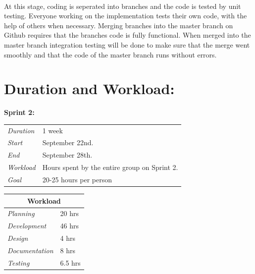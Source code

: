 \documentclass[11pt]{report}
\begin{document}
\paragraph{} At this stage, coding is seperated into branches and the code is tested by unit testing. Everyone working on the implementation tests their own code, with the help of others when necessary. Merging branches into the master branch on Github requires that the branches code is fully functional. When merged into the master branch integration testing will be done to make sure that the merge went smoothly and that the code of the master branch runs without errors. 

\section{Duration and Workload:}


\begin{minipage}{\linewidth}
\centering
\setlength{\tabcolsep}{22pt}
\textbf{Sprint 2:} 
\smallskip
{}
\begin{tabular}{ |l l| }
	\hline
	\it{Duration} & 1 week \\
	\it{Start} & September 22nd. \\
	\it{End} & September 28th. \\
	\it{Workload} & Hours spent by the entire group on Sprint 2. \\
	\it{Goal} & 20-25 hours per person \\
	\hline
\end{tabular}
\end{minipage}

\bigskip

\begin{minipage}{\linewidth}
\setlength{\tabcolsep}{25pt}
\centering
{}
\begin{tabular}{ |l|l| }
	\hline
	\multicolumn{2}{|c|}{\cellcolor{gray!25} Workload} \\
	\hline
	\it{Planning} & 20 hrs\\
	\it{Development} & 46 hrs \\
	\it{Design} & 4 hrs \\
	\it{Documentation} & 8 hrs \\
	\it{Testing} & 6.5 hrs \\
	\hline
\end{tabular}
\end{minipage}
\end{document}
